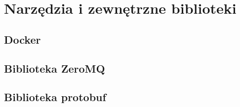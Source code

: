 \chapter{Narzędzia i zewnętrzne biblioteki}

\section{Docker}

\section{Biblioteka ZeroMQ}

\section{Biblioteka protobuf}